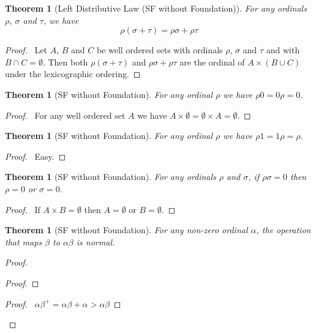 \documentclass{book}
\let\qed\relax
\newtheorem{thm}[ax]{Theorem}
\theoremstyle{definition}
\begin{document}
\begin{thm}[Left Distributive Law (SF without Foundation)]
For any ordinals $\rho$, $\sigma$ and $\tau$, we have
\[ \rho (\sigma + \tau) = \rho \sigma + \rho \tau \]
\end{thm}

\begin{proof}
\pf\ Let $A$, $B$ and $C$ be well ordered sets with ordinals $\rho$, $\sigma$ and $\tau$ and with $B \cap C = \emptyset$. Then both $\rho (\sigma + \tau)$ and $\rho \sigma + \rho \tau$ are the ordinal of $A \times (B \cup C)$ under the lexicographic ordering. \qed
\end{proof}

\begin{thm}[SF without Foundation]
For any ordinal $\rho$ we have $\rho 0 = 0 \rho = 0$.
\end{thm}

\begin{proof}
\pf\ For any well ordered set $A$ we have $A \times \emptyset = \emptyset \times A = \emptyset$. \qed
\end{proof}

\begin{thm}[SF without Foundation]
For any ordinal $\rho$ we have $\rho 1 = 1 \rho = \rho$.
\end{thm}

\begin{proof}
\pf\ Easy. \qed
\end{proof}

\begin{thm}[SF without Foundation]
For any ordinals $\rho$ and $\sigma$, if $\rho \sigma = 0$ then $\rho = 0$ or $\sigma = 0$.
\end{thm}

\begin{proof}
\pf\ If $A \times B = \emptyset$ then $A = \emptyset$ or $B = \emptyset$. \qed
\end{proof}

\begin{thm}[SF without Foundation]
\label{thm:multnormal}
For any non-zero ordinal $\alpha$, the operation that maps $\beta$ to $\alpha \beta$ is normal.
\end{thm}

\begin{proof}
\pf
{}
\begin{proof}
\end{proof}
\begin{proof}
	\pf\ $\alpha \beta^+ = \alpha \beta + \alpha > \alpha \beta$
\end{proof}
\qed
\end{proof}
\end{document}
